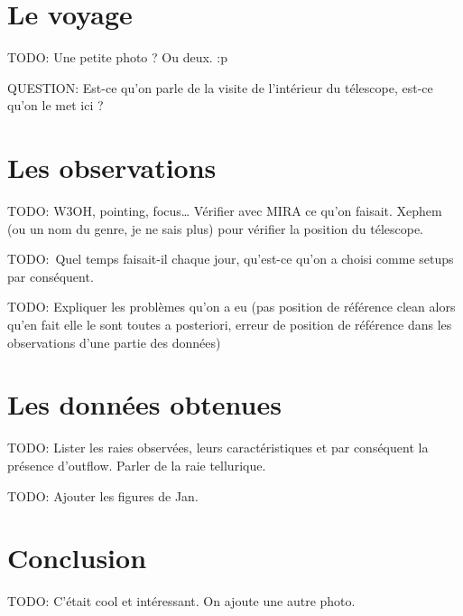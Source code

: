 \documentclass[a4paper,10pt,french]{article}
\begin{document}
\section{Le voyage}

TODO: Une petite photo ? Ou deux. :p

QUESTION: Est-ce qu’on parle de la visite de l’intérieur du télescope, est-ce
qu’on le met ici ?

\section{Les observations}

TODO: W3OH, pointing, focus… Vérifier avec MIRA ce qu’on faisait. Xephem (ou un
nom du genre, je ne sais plus) pour vérifier la position du télescope.

TODO: Quel temps faisait-il chaque jour, qu’est-ce qu’on a choisi comme setups
par conséquent.

TODO: Expliquer les problèmes qu’on a eu (pas position de référence clean alors
qu’en fait elle le sont toutes a posteriori, erreur de position de référence
dans les observations d’une partie des données)

\section{Les données obtenues}

TODO: Lister les raies observées, leurs caractéristiques et par conséquent la
présence d’outflow. Parler de la raie tellurique.

TODO: Ajouter les figures de Jan.

\section*{Conclusion}

TODO: C’était cool et intéressant. On ajoute une autre photo.
\end{document}
